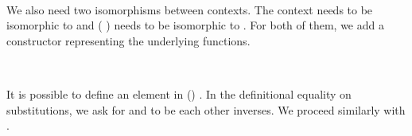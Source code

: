 \begin{AgdaAlign}
\begin{code}%
%
\>[4]\AgdaSpace{}%
\AgdaSymbol{:}\AgdaSpace{}%
\AgdaSymbol{\{}\AgdaSpace{}%
\AgdaSpace{}%
\AgdaSymbol{:}\AgdaSpace{}%
\AgdaSpace{}%
\AgdaSymbol{\}}\AgdaSpace{}%
\AgdaSpace{}%
\AgdaSpace{}%
\AgdaSpace{}%
\AgdaSpace{}%
\AgdaSpace{}%
\AgdaSpace{}%
\AgdaSymbol{(}\AgdaSpace{}%
\AgdaSymbol{)}\AgdaSpace{}%
\AgdaSymbol{(}\AgdaSpace{}%
\AgdaSymbol{)}\<%
\\
%
\>[4]\AgdaSpace{}%
\AgdaSymbol{:}\AgdaSpace{}%
\AgdaSymbol{\{}\AgdaSpace{}%
\AgdaSpace{}%
\AgdaSymbol{:}\AgdaSpace{}%
\AgdaSpace{}%
\AgdaSymbol{\}}\AgdaSpace{}%
\AgdaSpace{}%
\AgdaSpace{}%
\AgdaSymbol{(}\AgdaSpace{}%
\AgdaSymbol{)}\AgdaSpace{}%
\AgdaSymbol{(}\AgdaSpace{}%
\AgdaSymbol{)}\AgdaSpace{}%
\AgdaSpace{}%
\AgdaSpace{}%
\AgdaSpace{}%
\<%
\end{code}

We also need two isomorphisms between contexts. The context  needs
to be isomorphic to  and  ( \IC{,} )
needs to be isomorphic to   \IC{,} 
. For both of them, we add a constructor representing the underlying functions.

\begin{code}%
%
\>[4]\AgdaSpace{}%
\AgdaSymbol{:}\AgdaSpace{}%
\AgdaSpace{}%
\AgdaSpace{}%
\AgdaSymbol{(}\AgdaSpace{}%
\AgdaSymbol{)}\<%
\\
%
\>[4]\AgdaSpace{}%
\AgdaSymbol{:}\AgdaSpace{}%
\AgdaSymbol{(}\AgdaSpace{}%
\AgdaSymbol{:}\AgdaSpace{}%
\AgdaSpace{}%
\AgdaSymbol{)}\AgdaSpace{}%
\AgdaSymbol{(}\AgdaSpace{}%
\AgdaSymbol{:}\AgdaSpace{}%
\AgdaSpace{}%
\AgdaSymbol{)}\AgdaSpace{}%
\AgdaSpace{}%
\AgdaSpace{}%
\AgdaSymbol{(}\AgdaSpace{}%
\AgdaSpace{}%
\AgdaOperator{\AgdaInductiveConstructor{,}}\AgdaSpace{}%
\AgdaSpace{}%
\AgdaSymbol{)}\AgdaSpace{}%
\AgdaSymbol{(}\AgdaSpace{}%
\AgdaSymbol{(}\AgdaSpace{}%
\AgdaOperator{\AgdaInductiveConstructor{,}}\AgdaSpace{}%
\AgdaSymbol{))}\<%
\end{code}
\end{AgdaAlign}
It is possible to define an element  in 
() . In the definitional
equality on substitutions, we ask for  and
 to be each other inverses. We proceed similarly with
.

